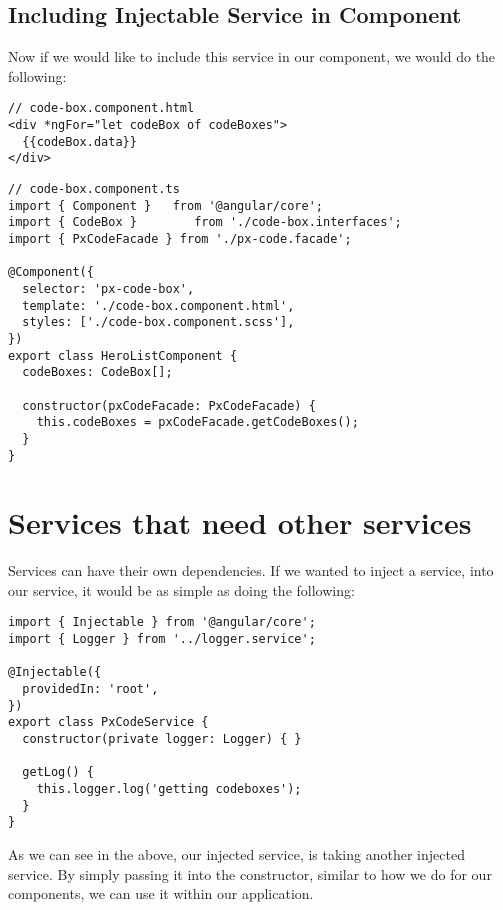 \subsection{ Including Injectable Service in Component }
Now if we would like to include this service in our component, we would do the
following:
\begin{lstlisting}
// code-box.component.html
<div *ngFor="let codeBox of codeBoxes">
  {{codeBox.data}}
</div>
\end{lstlisting}

\begin{lstlisting}
// code-box.component.ts
import { Component }   from '@angular/core';
import { CodeBox }        from './code-box.interfaces';
import { PxCodeFacade } from './px-code.facade';

@Component({
  selector: 'px-code-box',
  template: './code-box.component.html',
  styles: ['./code-box.component.scss'],
})
export class HeroListComponent {
  codeBoxes: CodeBox[];

  constructor(pxCodeFacade: PxCodeFacade) {
    this.codeBoxes = pxCodeFacade.getCodeBoxes();
  }
}
\end{lstlisting}


\section{Services that need other services}
Services can have their own dependencies. If we wanted to inject a service, into
our service, it would be as simple as doing the following:
\begin{lstlisting}
import { Injectable } from '@angular/core';
import { Logger } from '../logger.service';

@Injectable({
  providedIn: 'root',
})
export class PxCodeService {
  constructor(private logger: Logger) { }

  getLog() {
    this.logger.log('getting codeboxes');
  }
}
\end{lstlisting}

As we can see in the above, our injected service, is taking another injected
service. By simply passing it into the constructor, similar to how we do for our
components, we can use it within our application.

